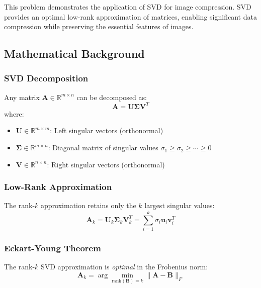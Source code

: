 \documentclass[12pt,a4paper]{article}
\begin{document}
This problem demonstrates the application of SVD for image compression. SVD provides an optimal low-rank approximation of matrices, enabling significant data compression while preserving the essential features of images.

\subsection{Mathematical Background}

\subsubsection{SVD Decomposition}

Any matrix $\mathbf{A} \in \mathbb{R}^{m \times n}$ can be decomposed as:
\begin{equation}
    \mathbf{A} = \mathbf{U} \boldsymbol{\Sigma} \mathbf{V}^T
\end{equation}
where:
\begin{itemize}
    \item $\mathbf{U} \in \mathbb{R}^{m \times m}$: Left singular vectors (orthonormal)
    \item $\boldsymbol{\Sigma} \in \mathbb{R}^{m \times n}$: Diagonal matrix of singular values $\sigma_1 \geq \sigma_2 \geq \cdots \geq 0$
    \item $\mathbf{V} \in \mathbb{R}^{n \times n}$: Right singular vectors (orthonormal)
\end{itemize}

\subsubsection{Low-Rank Approximation}

The rank-$k$ approximation retains only the $k$ largest singular values:
\begin{equation}
    \mathbf{A}_k = \mathbf{U}_k \boldsymbol{\Sigma}_k \mathbf{V}_k^T = \sum_{i=1}^{k} \sigma_i \mathbf{u}_i \mathbf{v}_i^T
\end{equation}

\subsubsection{Eckart-Young Theorem}

The rank-$k$ SVD approximation is \textit{optimal} in the Frobenius norm:
\begin{equation}
    \mathbf{A}_k = \arg\min_{\text{rank}(\mathbf{B}) = k} \|\mathbf{A} - \mathbf{B}\|_F
\end{equation}
\end{document}
